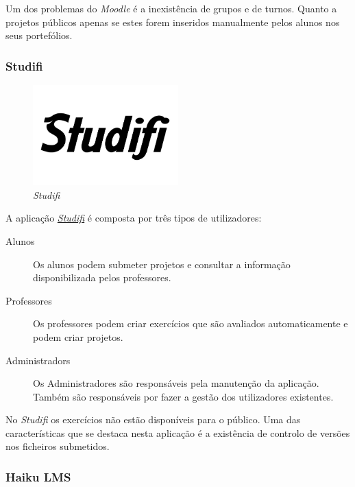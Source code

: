 Um dos problemas do \emph{Moodle} é a inexistência de grupos e de turnos. Quanto a projetos públicos apenas se estes forem inseridos manualmente pelos alunos nos seus portefólios.

\subsubsection{Studifi} %
\label{ssub:studifi}

\begin{figure}[H]
        \centering
        \includegraphics[width=0.5\textwidth]{images/concorrencia/studifi.png}
         \caption{\emph{Studifi}}
         \label{fig: studifi}
\end{figure}

A aplicação \href{https://studifi.com/}{\emph{Studifi}} é composta por três tipos de utilizadores:

\begin{description}
	\item[Alunos] Os alunos podem submeter projetos e consultar a informação disponibilizada pelos professores.
	\item[Professores] Os professores podem criar exercícios que são avaliados automaticamente e podem criar projetos.
	\item[Administradors] Os Administradores são responsáveis pela manutenção da aplicação. Também são responsáveis por fazer a gestão dos utilizadores existentes.
\end{description}

No \emph{Studifi} os exercícios não estão disponíveis para o público. Uma das características que se destaca nesta aplicação é a existência de controlo de versões nos ficheiros submetidos.


\subsubsection{Haiku LMS} %
\label{ssub:haiku_lms}

